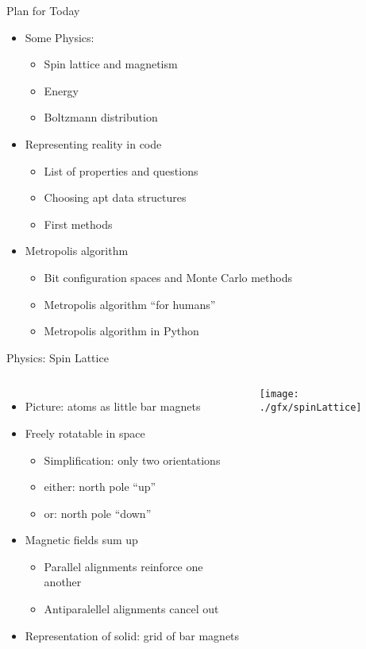 
\begin{frame}[fragile]{Plan for Today}
%
\begin{itemize}
\item Some Physics: 
	\begin{itemize}
	\item Spin lattice and magnetism
	\item Energy
	\item Boltzmann distribution
	\end{itemize}
\item Representing reality in code
	\begin{itemize}
	\item List of properties and questions
	\item Choosing apt data structures
	\item First methods
	\end{itemize}
\item Metropolis algorithm
	\begin{itemize}
	\item Bit configuration spaces and Monte Carlo methods
	\item Metropolis algorithm \enquote{for humans}
	\item Metropolis algorithm in Python
	\end{itemize}
\end{itemize}
%
\end{frame}


\begin{frame}{Physics: Spin Lattice}
%
\begin{columns}[T]
\begin{itemize}
\item Picture: atoms as little bar magnets
\item Freely rotatable in space
	\begin{itemize}
	\item Simplification: only two orientations
	\item either: north pole \enquote{up}
	\item or: north pole \enquote{down}
	\end{itemize}
\item Magnetic fields sum up
	\begin{itemize}
	\item Parallel alignments reinforce one another
	\item Antiparalellel alignments cancel out
	\end{itemize}
\item Representation of solid: grid of bar magnets
\end{itemize}
%
\texttt{[image: ./gfx/spinLattice]}
\end{columns}
%
\end{frame}

